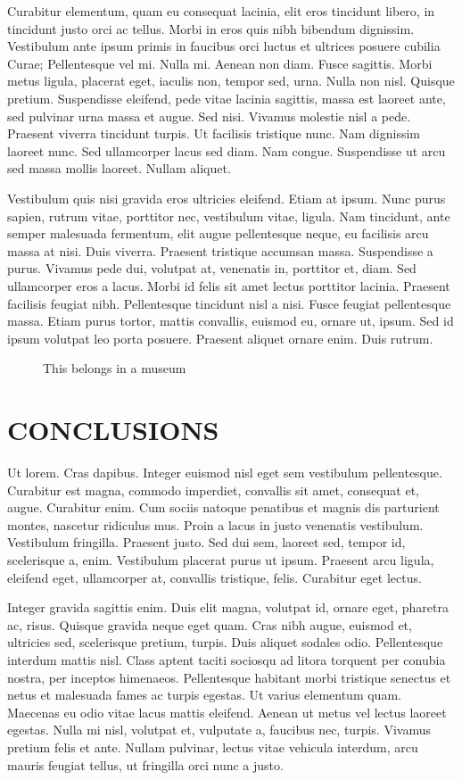 \documentclass[12pt]{article}
\begin{document}
Curabitur elementum, quam eu consequat lacinia, elit eros tincidunt libero, in tincidunt justo orci ac tellus. Morbi in eros quis nibh bibendum dignissim. Vestibulum ante ipsum primis in faucibus orci luctus et ultrices posuere cubilia Curae; Pellentesque vel mi. Nulla mi. Aenean non diam. Fusce sagittis. Morbi metus ligula, placerat eget, iaculis non, tempor sed, urna. Nulla non nisl. Quisque pretium. Suspendisse eleifend, pede vitae lacinia sagittis, massa est laoreet ante, sed pulvinar urna massa et augue. Sed nisi. Vivamus molestie nisl a pede. Praesent viverra tincidunt turpis. Ut facilisis tristique nunc. Nam dignissim laoreet nunc. Sed ullamcorper lacus sed diam. Nam congue. Suspendisse ut arcu sed massa mollis laoreet. Nullam aliquet.

Vestibulum quis nisi gravida eros ultricies eleifend. Etiam at ipsum. Nunc purus sapien, rutrum vitae, porttitor nec, vestibulum vitae, ligula. Nam tincidunt, ante semper malesuada fermentum, elit augue pellentesque neque, eu facilisis arcu massa at nisi. Duis viverra. Praesent tristique accumsan massa. Suspendisse a purus. Vivamus pede dui, volutpat at, venenatis in, porttitor et, diam. Sed ullamcorper eros a lacus. Morbi id felis sit amet lectus porttitor lacinia. Praesent facilisis feugiat nibh. Pellentesque tincidunt nisl a nisi. Fusce feugiat pellentesque massa. Etiam purus tortor, mattis convallis, euismod eu, ornare ut, ipsum. Sed id ipsum volutpat leo porta posuere. Praesent aliquet ornare enim. Duis rutrum.

\begin{figure}
\centering
{}
\caption{This belongs in a museum}
\label{museum}
\end{figure}

\section{CONCLUSIONS}
Ut lorem. Cras dapibus. Integer euismod nisl eget sem vestibulum pellentesque. Curabitur est magna, commodo imperdiet, convallis sit amet, consequat et, augue. Curabitur enim. Cum sociis natoque penatibus et magnis dis parturient montes, nascetur ridiculus mus. Proin a lacus in justo venenatis vestibulum. Vestibulum fringilla. Praesent justo. Sed dui sem, laoreet sed, tempor id, scelerisque a, enim. Vestibulum placerat purus ut ipsum. Praesent arcu ligula, eleifend eget, ullamcorper at, convallis tristique, felis. Curabitur eget lectus.

Integer gravida sagittis enim. Duis elit magna, volutpat id, ornare eget, pharetra ac, risus. Quisque gravida neque eget quam. Cras nibh augue, euismod et, ultricies sed, scelerisque pretium, turpis. Duis aliquet sodales odio. Pellentesque interdum mattis nisl. Class aptent taciti sociosqu ad litora torquent per conubia nostra, per inceptos himenaeos. Pellentesque habitant morbi tristique senectus et netus et malesuada fames ac turpis egestas. Ut varius elementum quam. Maecenas eu odio vitae lacus mattis eleifend. Aenean ut metus vel lectus laoreet egestas. Nulla mi nisl, volutpat et, vulputate a, faucibus nec, turpis. Vivamus pretium felis et ante. Nullam pulvinar, lectus vitae vehicula interdum, arcu mauris feugiat tellus, ut fringilla orci nunc a justo.
\end{document}
